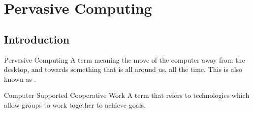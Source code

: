 \documentclass[\main/notes.tex]{subfiles}
\begin{document}
	\setcounter{chapter}{9}
	\chapter{Pervasive Computing}
		\section{Introduction}
			\begin{definition}{Pervasive Computing}
				A term meaning the move of the computer away from the desktop, and towards something that is all around us, all the time. This is also known as .
			\end{definition}
			\begin{definition}{Computer Supported Cooperative Work}
				A term that refers to technologies which allow groups to work together to achieve goals.
			\end{definition}
	\vbox{}
\end{document}
